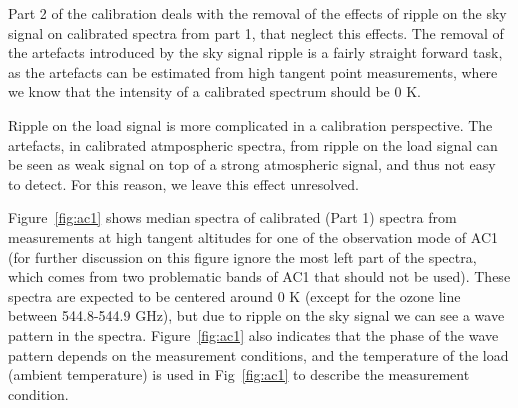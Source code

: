 Part 2 of the calibration deals with the removal
of the effects of ripple on the sky signal on calibrated
spectra from part 1, that neglect this effects.
The removal of the artefacts introduced by the sky signal
ripple is a fairly straight forward task, as the artefacts
can be estimated from high tangent point measurements,
where we know that the intensity of a calibrated spectrum should be 0 K.

Ripple on the load signal is more complicated in 
a calibration perspective. The artefacts, in calibrated
atmpospheric spectra, from ripple on the
load signal can be seen as weak signal on top of a strong
atmospheric signal, and thus not easy to detect.
For this reason, we leave this effect unresolved.

Figure~\ref{fig:ac1} shows median spectra of calibrated (Part 1) spectra
from measurements at high tangent altitudes for one of the
observation mode of AC1 (for further discussion on this figure
ignore the most left part of the spectra, which comes from two 
problematic bands of AC1 that should not be used). 
These spectra are expected to be 
centered around 0 K (except for the ozone line between 544.8-544.9 GHz), 
but due to ripple on the sky signal we can see a wave pattern in the spectra.
Figure~\ref{fig:ac1} also indicates that the phase of the wave pattern
depends on the measurement conditions, and the temperature of
the load (ambient temperature) is used in Fig~\ref{fig:ac1}
to describe the measurement condition.


